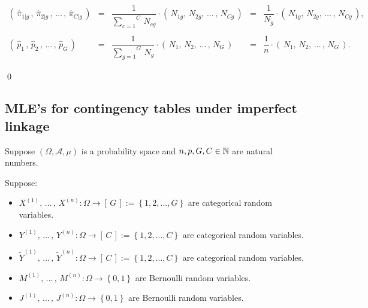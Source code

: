 \begin{enumerate}
\begin{equation*}
\begin{array}{ccccc}
		\left(\,\widehat{\pi}_{1\vert g}\,,\,\widehat{\pi}_{2\vert g}\,, \,\ldots\,, \,\widehat{\pi}_{C\vert g}\,\right)
		& = & \dfrac{1}{\overset{C}{\underset{c=1}{\sum}}\,N_{cg}} \cdot \left(\,N_{1g},\,N_{2g}, \,\ldots\,,\, N_{Cg}\,\right)
		& = & \dfrac{1}{N_{g}} \cdot \left(\,N_{1g},\,N_{2g}, \,\ldots\,,\, N_{Cg}\,\right),
		\\ \\
		\left(\,\widehat{p}_{1}\,,\,\widehat{p}_{2}\,, \,\ldots\,, \,\widehat{p}_{G}\,\right)
		& = & \dfrac{1}{\overset{G}{\underset{g=1}{\sum}}\,N_{g}} \cdot \left(\,N_{1},\,N_{2}, \,\ldots\,,\, N_{G}\,\right)
		& = & \dfrac{1}{n} \cdot \left(\,N_{1},\,N_{2}, \,\ldots\,,\, N_{G}\,\right).
		\end{array}
	\end{equation*}
\end{enumerate}
\qed


\subsection{MLE's for contingency tables under imperfect linkage}

Suppose
$\left(\Omega,\mathcal{A},\mu\right)$ is a probability space and
$n, p, G, C \in \mathbb{N}$ are natural numbers.

\vskip 0.3cm
\noindent
Suppose:
\begin{itemize}
\item
	$X^{(1)}, \,\ldots\,,\, X^{(n)} : \Omega \longrightarrow \left[\,G\,\right] := \left\{1,2,\ldots,G\right\}$
	are categorical random variables.
\item
	$Y^{(1)}, \,\ldots\,,\, Y^{(n)} : \Omega \longrightarrow \left[\,C\,\right] := \left\{1,2,\ldots,C\right\}$
	are categorical random variables.
\item
	$\widetilde{Y}^{(1)}, \,\ldots\,,\, \widetilde{Y}^{(n)} : \Omega \longrightarrow \left[\,C\,\right] := \left\{1,2,\ldots,C\right\}$
	are categorical random variables.
\item
	$M^{(1)}, \,\ldots\,,\, M^{(n)} : \Omega \longrightarrow \left\{0,1\right\}$
	are Bernoulli random variables.
\item
	$J^{(1)}, \,\ldots\,,\, J^{(n)} : \Omega \longrightarrow \left\{0,1\right\}$
	are Bernoulli random variables.
\end{itemize}

